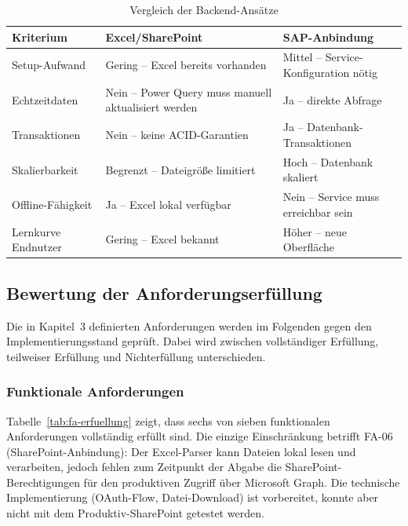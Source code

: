 \begin{table}[H]
\centering
\caption{Vergleich der Backend-Ansätze}
\label{tab:vergleich}
\begin{tabularx}{\textwidth}{l>{\raggedright\arraybackslash}X>{\raggedright\arraybackslash}X}
\toprule
\textbf{Kriterium} & \textbf{Excel/SharePoint} & \textbf{SAP-Anbindung} \\
\midrule
Setup-Aufwand & Gering -- Excel bereits vorhanden & Mittel -- Service-Konfiguration nötig \\
\midrule
Echtzeitdaten & Nein -- Power Query muss manuell aktualisiert werden & Ja -- direkte Abfrage \\
\midrule
Transaktionen & Nein -- keine ACID-Garantien & Ja -- Datenbank-Transaktionen \\
\midrule
Skalierbarkeit & Begrenzt -- Dateigröße limitiert & Hoch -- Datenbank skaliert \\
\midrule
Offline-Fähigkeit & Ja -- Excel lokal verfügbar & Nein -- Service muss erreichbar sein \\
\midrule
Lernkurve Endnutzer & Gering -- Excel bekannt & Höher -- neue Oberfläche \\
\bottomrule
\end{tabularx}
\end{table}

\subsection{Bewertung der Anforderungserfüllung}

Die in Kapitel~3 definierten Anforderungen werden im Folgenden gegen den Implementierungsstand geprüft. Dabei wird zwischen vollständiger Erfüllung, teilweiser Erfüllung und Nichterfüllung unterschieden.

\subsubsection{Funktionale Anforderungen}

Tabelle~\ref{tab:fa-erfuellung} zeigt, dass sechs von sieben funktionalen Anforderungen vollständig erfüllt sind. Die einzige Einschränkung betrifft FA-06 (SharePoint-Anbindung): Der Excel-Parser kann Dateien lokal lesen und verarbeiten, jedoch fehlen zum Zeitpunkt der Abgabe die SharePoint-Berechtigungen für den produktiven Zugriff über Microsoft Graph. Die technische Implementierung (OAuth-Flow, Datei-Download) ist vorbereitet, konnte aber nicht mit dem Produktiv-SharePoint getestet werden.

